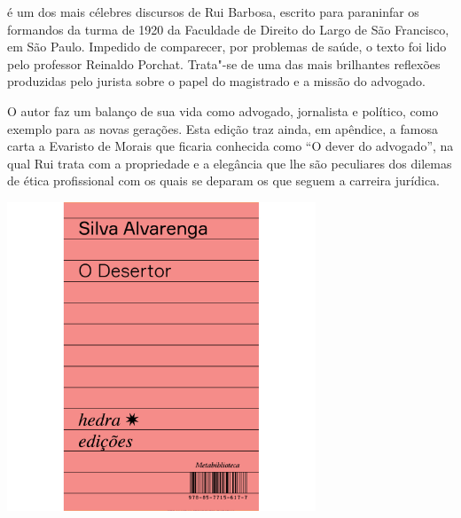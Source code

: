 \hspace*{-7cm}\hrulefill\hspace*{-7cm}

\medskip

 é um dos mais célebres discursos de Rui
Barbosa, escrito para paraninfar os formandos da
turma de 1920 da Faculdade de Direito do Largo de São Francisco, em São
Paulo. Impedido de comparecer,  por problemas de saúde, o texto foi
lido pelo professor Reinaldo Porchat. Trata"-se de uma das mais
brilhantes reflexões produzidas pelo jurista sobre o papel do
magistrado e a missão do advogado.

O autor faz um balanço de sua vida
como advogado, jornalista e político, como exemplo para as novas
gerações. Esta edição traz ainda, em apêndice, a famosa carta
a Evaristo de Morais que ficaria conhecida como ``O dever do advogado'',
na qual Rui trata com a propriedade e a elegância que lhe são peculiares
dos dilemas de ética profissional com os quais se deparam os que 
seguem a carreira jurídica. 

\vfill

\hspace*{-.4cm}\begin{minipage}[c]{.5\linewidth}
\small{
{}}
\end{minipage}

\pagebreak

\hspace{.5cm}

\begin{center}
\hspace*{-2.5cm}
\hspace*{2.5cm}\includegraphics[width=92mm]{./grid/desertor.jpg}
\end{center}

